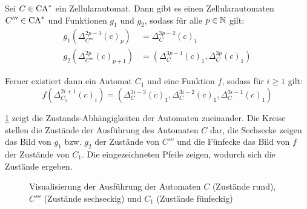 \begin{satz}
    \label{CAgfSpeedup}
    Sei $C \in \textrm{CA}^*$ ein Zellularautomat.
    Dann gibt es einen Zellularautomaten $C''' \in \textrm{CA}^*$ und Funktionen $g_1$ und $g_2$, sodass für alle $p \in \mathbb{N}$ gilt:
    \begin{align*}
        g_1(\Delta_{C'''}^{2p-1}(c)_p) & = \Delta_C^{3p-2}(c)_1 \\
        g_2(\Delta_{C'''}^{2p}(c)_{p+1}) & = (\Delta_C^{3p-1}(c)_1, \Delta_C^{3p}(c)_1)
    \end{align*}
    
    Ferner existiert dann ein Automat $C_1$ und eine Funktion $f$, sodass für $i \geq 1$ gilt:
    \[
        f(\Delta_{C_1}^{2i+1}(c)_i) = (\Delta_C^{3i-3}(c)_1, \Delta_C^{3i-2}(c)_1, \Delta_C^{3i-1}(c)_1)
    \]
    
    \cref{fig:RealzeitSpeedup} zeigt die Zustands-Abhängigkeiten der Automaten zueinander.
    Die Kreise stellen die Zustände der Ausführung des Automaten $C$ dar, die Sechsecke zeigen das Bild von $g_1$ bzw. $g_2$
    der Zustände von $C'''$ und die Fünfecke das Bild von $f$ der Zustände von $C_1$. Die eingezeichneten Pfeile
    zeigen, wodurch sich die Zustände ergeben.
    
    \begin{figure}[H]
        \centering
        
        \caption{Visualisierung der Ausführung der Automaten $C$ (Zustände rund), $C'''$ (Zustände sechseckig) und $C_1$ (Zustände fünfeckig)}
        \label{fig:RealzeitSpeedup}
    \end{figure}
\end{satz}
